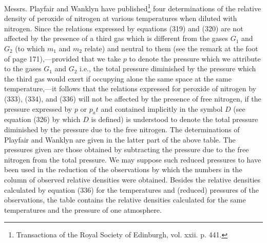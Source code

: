 \documentclass[12pt]{memoir}
\begin{document}
Messrs. Playfair and Wanklyn have published\footnote{Transactiona of the Royal Society of Edinburgh, vol. xxii. p. 441.} four determinations of the relative density of peroxide of nitrogen at various temperatures when diluted with nitrogen. Since the relations expressed by equations (319) and (320) are not affected by the presence of a third gas which is different from the gases $G_1$  and $G_2$ (to which $m_1$ and $m_2$ relate) and neutral to them (see the remark at the foot of page 171),---provided that we take $p$ to denote the pressure which we attribute to the gases $G_1$ and $G_2$ i.e., the total pressure diminished by the pressure which the third gas would exert if occupying alone the same space at the same temperature,---it follows that the relations expressed for peroxide of nitrogen by (333), (334), and (336) will not be affected by the presence of free nitrogen, if the pressure expressed by $p$ or $p_at$ and contained implicitly in the symbol $D$ (see equation (326) by which $D$ is defined) is understood to denote the total pressure diminished by the pressure due to the free nitrogen. The determinations of Playfair and Wanklyn are given in the latter part of the above table. The pressures given are those obtained by subtracting the pressure due to the free nitrogen from the total pressure. We may suppose such reduced pressures to have been used in the reduction of the observations by which the numbers in the column of observed relative densities were obtained. Besides the relative densities calculated by equation (336) for the temperatures and (reduced) pressures of the observations, the table contains the relative densities calculated for the same temperatures and the pressure of one atmosphere.
\end{document}
